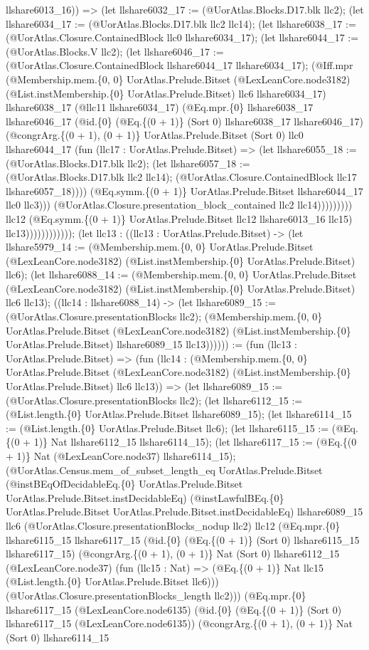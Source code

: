 \documentclass[11pt]{article}
\begin{document}
llshare6013\_16)) => (let llshare6032\_17 := (@UorAtlas.Blocks.D17.blk llc2); (let llshare6034\_17 := (@UorAtlas.Blocks.D17.blk llc2 llc14); (let llshare6038\_17 := (@UorAtlas.Closure.ContainedBlock llc0 llshare6034\_17); (let llshare6044\_17 := (@UorAtlas.Blocks.V llc2); (let llshare6046\_17 := (@UorAtlas.Closure.ContainedBlock llshare6044\_17 llshare6034\_17); (@Iff.mpr (@Membership.mem.\{0, 0\} UorAtlas.Prelude.Bitset (@LexLeanCore.node3182) (@List.instMembership.\{0\} UorAtlas.Prelude.Bitset) llc6 llshare6034\_17) llshare6038\_17 (@llc11 llshare6034\_17) (@Eq.mpr.\{0\} llshare6038\_17 llshare6046\_17 (@id.\{0\} (@Eq.\{(0 + 1)\} (Sort 0) llshare6038\_17 llshare6046\_17) (@congrArg.\{(0 + 1), (0 + 1)\} UorAtlas.Prelude.Bitset (Sort 0) llc0 llshare6044\_17 (fun (llc17 : UorAtlas.Prelude.Bitset) => (let llshare6055\_18 := (@UorAtlas.Blocks.D17.blk llc2); (let llshare6057\_18 := (@UorAtlas.Blocks.D17.blk llc2 llc14); (@UorAtlas.Closure.ContainedBlock llc17 llshare6057\_18)))) (@Eq.symm.\{(0 + 1)\} UorAtlas.Prelude.Bitset llshare6044\_17 llc0 llc3))) (@UorAtlas.Closure.presentation\_block\_contained llc2 llc14))))))))) llc12 (@Eq.symm.\{(0 + 1)\} UorAtlas.Prelude.Bitset llc12 llshare6013\_16 llc15) llc13)))))))))))); (let llc13 : ((llc13 : UorAtlas.Prelude.Bitset) -> (let llshare5979\_14 := (@Membership.mem.\{0, 0\} UorAtlas.Prelude.Bitset (@LexLeanCore.node3182) (@List.instMembership.\{0\} UorAtlas.Prelude.Bitset) llc6); (let llshare6088\_14 := (@Membership.mem.\{0, 0\} UorAtlas.Prelude.Bitset (@LexLeanCore.node3182) (@List.instMembership.\{0\} UorAtlas.Prelude.Bitset) llc6 llc13); ((llc14 : llshare6088\_14) -> (let llshare6089\_15 := (@UorAtlas.Closure.presentationBlocks llc2); (@Membership.mem.\{0, 0\} UorAtlas.Prelude.Bitset (@LexLeanCore.node3182) (@List.instMembership.\{0\} UorAtlas.Prelude.Bitset) llshare6089\_15 llc13)))))) := (fun (llc13 : UorAtlas.Prelude.Bitset) => (fun (llc14 : (@Membership.mem.\{0, 0\} UorAtlas.Prelude.Bitset (@LexLeanCore.node3182) (@List.instMembership.\{0\} UorAtlas.Prelude.Bitset) llc6 llc13)) => (let llshare6089\_15 := (@UorAtlas.Closure.presentationBlocks llc2); (let llshare6112\_15 := (@List.length.\{0\} UorAtlas.Prelude.Bitset llshare6089\_15); (let llshare6114\_15 := (@List.length.\{0\} UorAtlas.Prelude.Bitset llc6); (let llshare6115\_15 := (@Eq.\{(0 + 1)\} Nat llshare6112\_15 llshare6114\_15); (let llshare6117\_15 := (@Eq.\{(0 + 1)\} Nat (@LexLeanCore.node37) llshare6114\_15); (@UorAtlas.Census.mem\_of\_subset\_length\_eq UorAtlas.Prelude.Bitset (@instBEqOfDecidableEq.\{0\} UorAtlas.Prelude.Bitset UorAtlas.Prelude.Bitset.instDecidableEq) (@instLawfulBEq.\{0\} UorAtlas.Prelude.Bitset UorAtlas.Prelude.Bitset.instDecidableEq) llshare6089\_15 llc6 (@UorAtlas.Closure.presentationBlocks\_nodup llc2) llc12 (@Eq.mpr.\{0\} llshare6115\_15 llshare6117\_15 (@id.\{0\} (@Eq.\{(0 + 1)\} (Sort 0) llshare6115\_15 llshare6117\_15) (@congrArg.\{(0 + 1), (0 + 1)\} Nat (Sort 0) llshare6112\_15 (@LexLeanCore.node37) (fun (llc15 : Nat) => (@Eq.\{(0 + 1)\} Nat llc15 (@List.length.\{0\} UorAtlas.Prelude.Bitset llc6))) (@UorAtlas.Closure.presentationBlocks\_length llc2))) (@Eq.mpr.\{0\} llshare6117\_15 (@LexLeanCore.node6135) (@id.\{0\} (@Eq.\{(0 + 1)\} (Sort 0) llshare6117\_15 (@LexLeanCore.node6135)) (@congrArg.\{(0 + 1), (0 + 1)\} Nat (Sort 0) llshare6114\_15 
\end{document}
